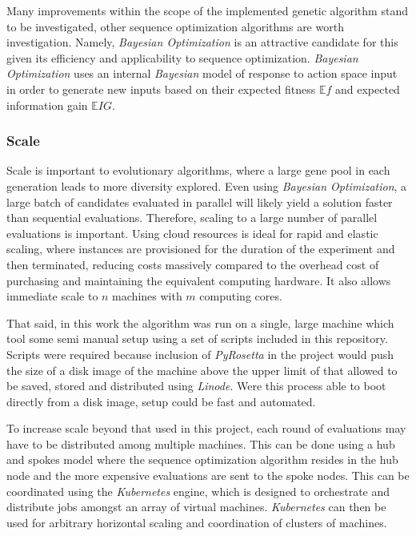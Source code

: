 \documentclass[16pt]{book}
\begin{document}
Many improvements within the scope of the implemented genetic algorithm stand to be investigated, other sequence optimization algorithms are worth investigation.
Namely, \textit{Bayesian Optimization} is an attractive candidate for this given its efficiency and applicability to sequence optimization.
\textit{Bayesian Optimization} uses an internal \textit{Bayesian} model of response to action space input in order to generate new inputs based on their expected fitness  $\mathbb{E} f$ and expected information gain $\mathbb{E}IG$.

\subsubsection{Scale}

Scale is important to evolutionary algorithms, where a large gene pool in each generation leads to more diversity explored.
Even using \textit{Bayesian Optimization}, a large batch of candidates evaluated in parallel will likely yield a solution faster than sequential evaluations.
Therefore, scaling to a large number of parallel evaluations is important.
Using cloud resources is ideal for rapid and elastic scaling, where instances are provisioned for the duration of the experiment and then terminated, reducing costs massively compared to the overhead cost of purchasing and maintaining the equivalent computing hardware.
It also allows immediate scale to $n$ machines with $m$ computing cores.

That said, in this work the algorithm was run on a single, large machine which tool some semi manual setup using a set of scripts included in this repository.
Scripts were required because inclusion of \textit{PyRosetta} in the project would push the size of a disk image of the machine above the upper limit of that allowed to be saved, stored and distributed using \textit{Linode}.
Were this process able to boot directly from a disk image, setup could be fast and automated.

To increase scale beyond that used in this project, each round of evaluations may have to be distributed among multiple machines.
This can be done using a hub and spokes model where the sequence optimization algorithm resides in the hub node and the more expensive evaluations are sent to the spoke nodes.
This can be coordinated using the \textit{Kubernetes} engine, which is designed to orchestrate and distribute jobs amongst an array of virtual machines.
\textit{Kubernetes} can then be used for arbitrary horizontal scaling and coordination of clusters of machines.
\end{document}
